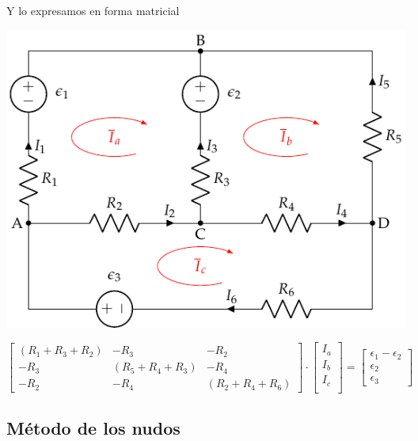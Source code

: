 \documentclass[xcolor={usenames,svgnames,dvipsnames}]{beamer}
\begin{document}
\begin{frame}[label={sec:org684ba4f}]{Y lo expresamos en forma matricial}
\begin{center}
\includegraphics[height=0.5\textheight]{figs/mallas1_corrientes.pdf}
\end{center}

\begin{equation*}
  \begin{bmatrix}
    (R_1 + R_3 + R_2) &  - R_3 & - R_2 \\
    - R_3 & (R_5 + R_4 + R_3) & - R_4 \\
    - R_2 & - R_4 &  (R_2 + R_4 + R_6)
  \end{bmatrix} \cdot %
  \begin{bmatrix}
    I_a\\
    I_b\\
    I_c\\
  \end{bmatrix} = %
  \begin{bmatrix}
    \epsilon_1 - \epsilon_2\\
    \epsilon_2\\
    \epsilon_3
  \end{bmatrix}
\end{equation*}
\end{frame}
\subsection{Método de los nudos}
\label{sec:org4999373}
\end{document}
